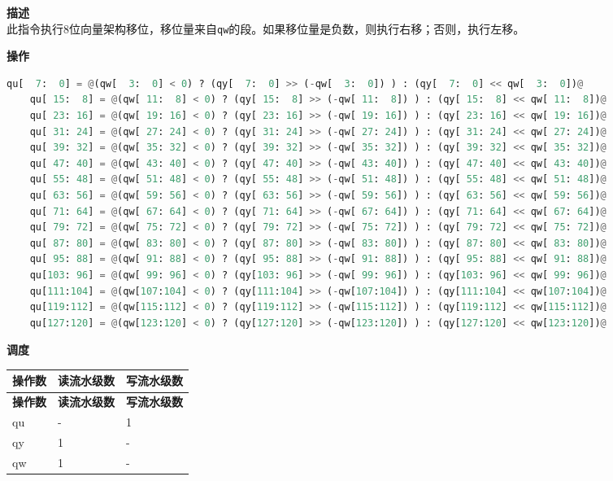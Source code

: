 \textbf{描述}\\
此指令执行8位向量架构移位，移位量来自\lstinline{qw}的段。如果移位量是负数，则执行右移；否则，执行左移。

\textbf{操作}\\
\begin{lstlisting}[language=Python, escapechar=@]
    qu[  7:  0] = @(qw[  3:  0] < 0) ? (qy[  7:  0] >> (-qw[  3:  0]) ) : (qy[  7:  0] << qw[  3:  0])@
    qu[ 15:  8] = @(qw[ 11:  8] < 0) ? (qy[ 15:  8] >> (-qw[ 11:  8]) ) : (qy[ 15:  8] << qw[ 11:  8])@
    qu[ 23: 16] = @(qw[ 19: 16] < 0) ? (qy[ 23: 16] >> (-qw[ 19: 16]) ) : (qy[ 23: 16] << qw[ 19: 16])@
    qu[ 31: 24] = @(qw[ 27: 24] < 0) ? (qy[ 31: 24] >> (-qw[ 27: 24]) ) : (qy[ 31: 24] << qw[ 27: 24])@
    qu[ 39: 32] = @(qw[ 35: 32] < 0) ? (qy[ 39: 32] >> (-qw[ 35: 32]) ) : (qy[ 39: 32] << qw[ 35: 32])@
    qu[ 47: 40] = @(qw[ 43: 40] < 0) ? (qy[ 47: 40] >> (-qw[ 43: 40]) ) : (qy[ 47: 40] << qw[ 43: 40])@
    qu[ 55: 48] = @(qw[ 51: 48] < 0) ? (qy[ 55: 48] >> (-qw[ 51: 48]) ) : (qy[ 55: 48] << qw[ 51: 48])@
    qu[ 63: 56] = @(qw[ 59: 56] < 0) ? (qy[ 63: 56] >> (-qw[ 59: 56]) ) : (qy[ 63: 56] << qw[ 59: 56])@
    qu[ 71: 64] = @(qw[ 67: 64] < 0) ? (qy[ 71: 64] >> (-qw[ 67: 64]) ) : (qy[ 71: 64] << qw[ 67: 64])@
    qu[ 79: 72] = @(qw[ 75: 72] < 0) ? (qy[ 79: 72] >> (-qw[ 75: 72]) ) : (qy[ 79: 72] << qw[ 75: 72])@
    qu[ 87: 80] = @(qw[ 83: 80] < 0) ? (qy[ 87: 80] >> (-qw[ 83: 80]) ) : (qy[ 87: 80] << qw[ 83: 80])@
    qu[ 95: 88] = @(qw[ 91: 88] < 0) ? (qy[ 95: 88] >> (-qw[ 91: 88]) ) : (qy[ 95: 88] << qw[ 91: 88])@
    qu[103: 96] = @(qw[ 99: 96] < 0) ? (qy[103: 96] >> (-qw[ 99: 96]) ) : (qy[103: 96] << qw[ 99: 96])@
    qu[111:104] = @(qw[107:104] < 0) ? (qy[111:104] >> (-qw[107:104]) ) : (qy[111:104] << qw[107:104])@
    qu[119:112] = @(qw[115:112] < 0) ? (qy[119:112] >> (-qw[115:112]) ) : (qy[119:112] << qw[115:112])@
    qu[127:120] = @(qw[123:120] < 0) ? (qy[127:120] >> (-qw[123:120]) ) : (qy[127:120] << qw[123:120])@
\end{lstlisting}

\textbf{调度}\\
\begin{longtable}[c]{|l|l|l|}
    \hline
    \rowcolor{lightgray}
    \textbf{操作数} & \textbf{读流水级数} & \textbf{写流水级数} \\\hline
    \endfirsthead
    \hline
    \rowcolor{lightgray}
     \textbf{操作数} & \textbf{读流水级数} & \textbf{写流水级数} \\\hline
    \endhead
    \hline
    \endfoot

  qu & - & 1 \\\hline
  qy & 1 & - \\\hline
  qw & 1 & -

\end{longtable}

